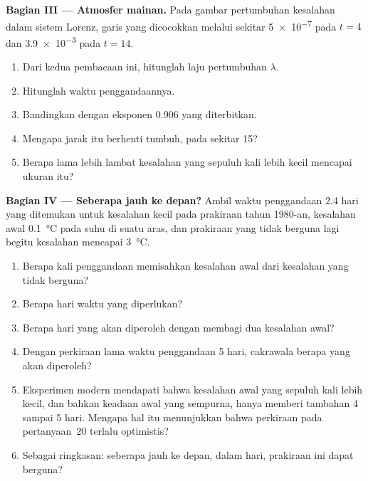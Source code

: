\begin{problem}
\medskip\noindent\textbf{Bagian III --- Atmosfer mainan.}
Pada gambar pertumbuhan kesalahan dalam sistem Lorenz, garis yang dicocokkan melalui
sekitar \num{5e-7} pada $t = 4$ dan \num{3.9e-3} pada $t = 14$.
\begin{enumerate}[resume]
  \item Dari kedua pembacaan ini, hitunglah laju pertumbuhan $\lambda$.
  \item Hitunglah waktu penggandaannya.
  \item Bandingkan dengan eksponen 0.906 yang diterbitkan.
  \item Mengapa jarak itu berhenti tumbuh, pada sekitar 15?
  \item Berapa lama lebih lambat kesalahan yang sepuluh kali lebih kecil mencapai ukuran itu?
\end{enumerate}

\medskip\noindent\textbf{Bagian IV --- Seberapa jauh ke depan?}
Ambil waktu penggandaan 2.4 hari yang ditemukan untuk kesalahan kecil pada prakiraan tahun 1980-an,
kesalahan awal \qty{0.1}{\celsius} pada suhu di suatu aras, dan prakiraan yang
tidak berguna lagi begitu kesalahan mencapai \qty{3}{\celsius}.
\begin{enumerate}[resume]
  \item Berapa kali penggandaan memisahkan kesalahan awal dari kesalahan yang tidak berguna?
  \item Berapa hari waktu yang diperlukan?
  \item Berapa hari yang akan diperoleh dengan membagi dua kesalahan awal?
  \item Dengan perkiraan lama waktu penggandaan 5 hari, cakrawala berapa yang akan diperoleh?
  \item Eksperimen modern mendapati bahwa kesalahan awal yang sepuluh kali lebih kecil, dan bahkan keadaan awal yang
        sempurna, hanya memberi tambahan 4 sampai 5 hari. Mengapa hal itu menunjukkan bahwa perkiraan pada
        pertanyaan~20 terlalu optimistis?
  \item Sebagai ringkasan: seberapa jauh ke depan, dalam hari, prakiraan ini dapat berguna?
\end{enumerate}
\end{problem}
